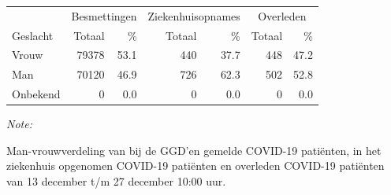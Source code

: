 \documentclass[
  english,
  man,floatsintext]{apa6}
\begin{document}
\begin{table}[H]
\centering\begingroup\fontsize{11}{13}\selectfont

\begin{threeparttable}
\begin{tabular}{lrrrrrr}
\toprule
\multicolumn{1}{c}{ } & \multicolumn{2}{c}{Besmettingen} & \multicolumn{2}{c}{Ziekenhuisopnames} & \multicolumn{2}{c}{Overleden} \\
\cmidrule(l{3pt}r{3pt}){2-3} \cmidrule(l{3pt}r{3pt}){4-5} \cmidrule(l{3pt}r{3pt}){6-7}
Geslacht & Totaal & \% & Totaal & \% & Totaal & \%\\
\midrule
Vrouw & 79378 & 53.1 & 440 & 37.7 & 448 & 47.2\\
Man & 70120 & 46.9 & 726 & 62.3 & 502 & 52.8\\
Onbekend & 0 & 0.0 & 0 & 0.0 & 0 & 0.0\\
\bottomrule
\end{tabular}
\begin{tablenotes}
\item \textit{Note: } 
\item Man-vrouwverdeling van bij de GGD’en gemelde COVID-19 patiënten, in het ziekenhuis opgenomen COVID-19 patiënten en overleden COVID-19 patiënten van 13 december t/m 27 december 10:00 uur.
\end{tablenotes}
\end{threeparttable}
\endgroup{}
\end{table}
\newpage
\end{document}

